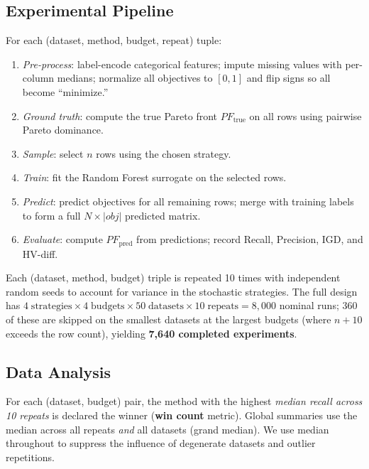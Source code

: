 \documentclass[sigconf,nonacm]{acmart}
\begin{document}
\subsection{Experimental Pipeline}
\label{sec:pipeline}

For each (dataset, method, budget, repeat) tuple:
\begin{enumerate}[leftmargin=*]
  \item \textit{Pre-process}: label-encode categorical features; impute missing
  values with per-column medians; normalize all objectives to $[0, 1]$ and
  flip signs so all become ``minimize.''

  \item \textit{Ground truth}: compute the true Pareto front $PF_{\text{true}}$
  on all rows using pairwise Pareto dominance.

  \item \textit{Sample}: select $n$ rows using the chosen strategy.

  \item \textit{Train}: fit the Random Forest surrogate on the selected rows.

  \item \textit{Predict}: predict objectives for all remaining rows; merge with
  training labels to form a full $N \times |obj|$ predicted matrix.

  \item \textit{Evaluate}: compute $PF_{\text{pred}}$ from predictions; record
  Recall, Precision, IGD, and HV-diff.
\end{enumerate}

\noindent Each (dataset, method, budget) triple is repeated 10 times with
independent random seeds to account for variance in the stochastic strategies.
The full design has $4\;\text{strategies} \times 4\;\text{budgets} \times
50\;\text{datasets} \times 10\;\text{repeats} = 8{,}000$ nominal runs;
360 of these are skipped on the smallest datasets at the largest budgets
(where $n+10$ exceeds the row count), yielding \textbf{7{,}640 completed
experiments}.

\subsection{Data Analysis}

For each (dataset, budget) pair, the method with the highest \emph{median
recall across 10 repeats} is declared the winner (\textbf{win count} metric).
Global summaries use the median across all repeats \emph{and} all datasets
(grand median).
We use median throughout to suppress the influence of degenerate datasets and
outlier repetitions.
\end{document}
